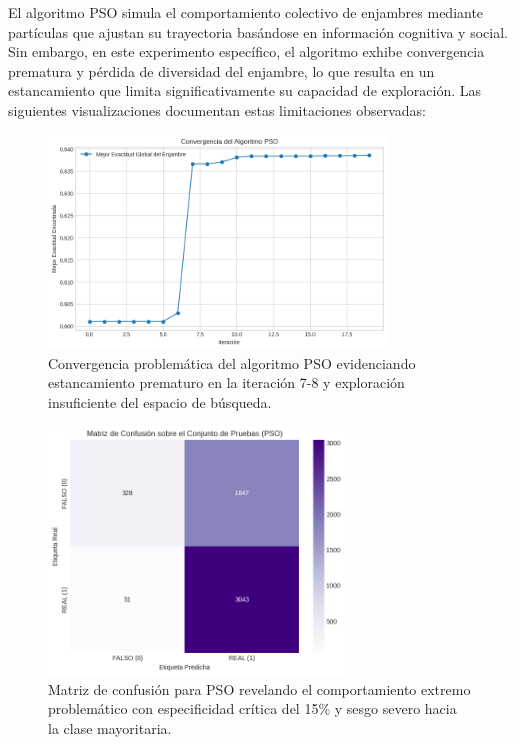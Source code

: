 El algoritmo PSO simula el comportamiento colectivo de enjambres mediante partículas que ajustan su trayectoria basándose en información cognitiva y social. Sin embargo, en este experimento específico, el algoritmo exhibe convergencia prematura y pérdida de diversidad del enjambre, lo que resulta en un estancamiento que limita significativamente su capacidad de exploración. Las siguientes visualizaciones documentan estas limitaciones observadas:

\begin{figure}[h!]
    \centering
    \includegraphics[width=0.8\textwidth]{Imagenes/convergencia_pso.png}
    \caption{Convergencia problemática del algoritmo PSO evidenciando estancamiento prematuro en la iteración 7-8 y exploración insuficiente del espacio de búsqueda.}
    \label{fig:convergencia_pso}
\end{figure}

\begin{figure}[h!]
    \centering
    \includegraphics[width=0.7\textwidth]{Imagenes/matriz_confusion_pso.png}
    \caption{Matriz de confusión para PSO revelando el comportamiento extremo problemático con especificidad crítica del 15\% y sesgo severo hacia la clase mayoritaria.}
    \label{fig:matriz_pso}
\end{figure}

